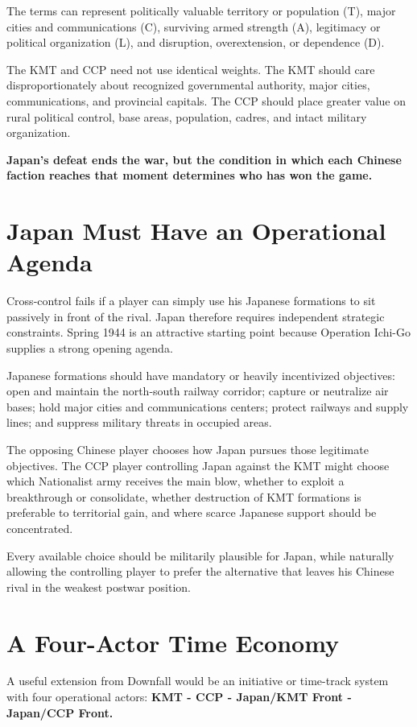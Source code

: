 \documentclass[11pt]{article}
\begin{document}
The terms can represent politically valuable territory or population (T), major cities and communications (C), surviving armed strength (A), legitimacy or political organization (L), and disruption, overextension, or dependence (D).


The KMT and CCP need not use identical weights. The KMT should care disproportionately about recognized governmental authority, major cities, communications, and provincial capitals. The CCP should place greater value on rural political control, base areas, population, cadres, and intact military organization.


\textbf{Japan's defeat ends the war, but the condition in which each Chinese faction reaches that moment determines who has won the game.}


\section{Japan Must Have an Operational Agenda}
Cross-control fails if a player can simply use his Japanese formations to sit passively in front of the rival. Japan therefore requires independent strategic constraints. Spring 1944 is an attractive starting point because Operation Ichi-Go supplies a strong opening agenda.


Japanese formations should have mandatory or heavily incentivized objectives: open and maintain the north-south railway corridor; capture or neutralize air bases; hold major cities and communications centers; protect railways and supply lines; and suppress military threats in occupied areas.


The opposing Chinese player chooses how Japan pursues those legitimate objectives. The CCP player controlling Japan against the KMT might choose which Nationalist army receives the main blow, whether to exploit a breakthrough or consolidate, whether destruction of KMT formations is preferable to territorial gain, and where scarce Japanese support should be concentrated.


Every available choice should be militarily plausible for Japan, while naturally allowing the controlling player to prefer the alternative that leaves his Chinese rival in the weakest postwar position.


\section{A Four-Actor Time Economy}
A useful extension from Downfall would be an initiative or time-track system with four operational actors: \textbf{KMT - CCP - Japan/KMT Front - Japan/CCP Front.}
\end{document}
